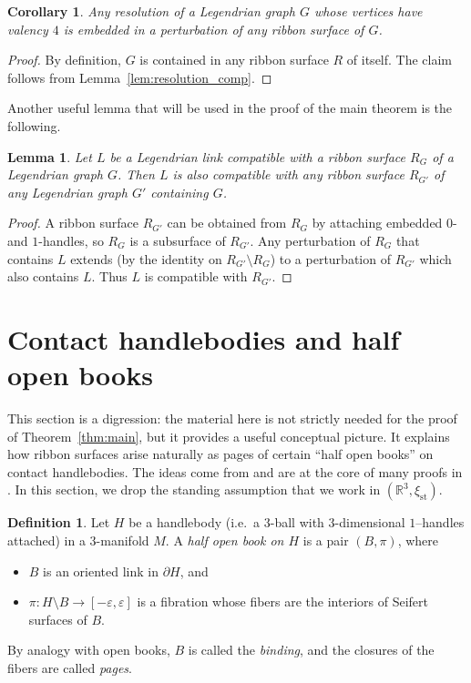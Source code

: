 \documentclass{amsart}
\numberwithin{equation}{section}
\numberwithin{figure}{section}
\newtheorem{lemma}[theorem]{Lemma}
\newtheorem{corollary}[theorem]{Corollary}
\theoremstyle{definition}
\newtheorem{definition}[theorem]{Definition}
\theoremstyle{remark}
\newcommand{\R}{\mathbb{R}}
\let\olddxi\xi %
\renewcommand{\xi}{\olddxi}
\newcommand{\xist}{\olddxi_{\mathrm{st}}}
\begin{document}
\begin{corollary}\label{cor:resolution_comp}
  Any resolution of a Legendrian graph $G$ whose vertices have valency $4$ is embedded in a perturbation of any ribbon surface of $G$.
\end{corollary}

\begin{proof}
  By definition, $G$ is contained in any ribbon surface $R$ of itself. The claim follows from Lemma~\ref{lem:resolution_comp}.
\end{proof}

Another useful lemma that will be used in the proof of the main theorem is the following.

\begin{lemma}\label{compatibility_extension}
  Let $L$ be a Legendrian link compatible with a ribbon surface $R_G$ of a Legendrian graph $G$. Then $L$ is also compatible with any ribbon surface $R_{G'}$ of any Legendrian graph $G'$ containing $G$.
\end{lemma}

\begin{proof}
  A ribbon surface $R_{G'}$ can be obtained from $R_G$ by attaching embedded $0$- and $1$-handles, so $R_G$ is a subsurface of $R_{G'}$. Any perturbation of $R_G$ that contains $L$ extends (by the identity on $R_{G'}\setminus R_G$) to a perturbation of $R_{G'}$ which also contains $L$. Thus $L$ is compatible with $R_{G'}$.
\end{proof}

\section{Contact handlebodies and half open books}\label{sec:contact_handlebodies}

This section is a digression: the material here is not strictly needed for the proof of Theorem~\ref{thm:main}, but it provides a useful conceptual picture. It explains how ribbon surfaces arise naturally as pages of certain ``half open books'' on contact handlebodies. The ideas come from \cite{Giroux91,Giroux02} and are at the core of many proofs in \cite{Avdek13}. In this section, we drop the standing assumption that we work in $(\R^3,\xist)$.

\begin{definition}
  Let $H$ be a handlebody (i.e.\ a $3$-ball with $3$-dimensional $1$–handles attached) in a $3$-manifold $M$. A \emph{half open book on $H$} is a pair $(B,\pi)$, where
  \begin{itemize}
    \item $B$ is an oriented link in $\partial H$, and
    \item $\pi\colon H\setminus B\to[-\varepsilon,\varepsilon]$ is a fibration whose fibers are the interiors of Seifert surfaces of $B$.
  \end{itemize}
  By analogy with open books, $B$ is called the \emph{binding}, and the closures of the fibers are called \emph{pages}.
\end{definition}
\end{document}
